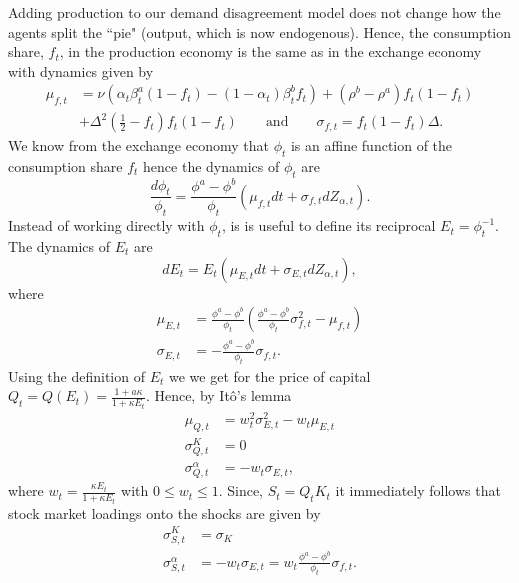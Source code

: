 Adding production to our demand disagreement model does not change how the agents split the ``pie" (output, which is now endogenous). Hence, the consumption share, $f_t$, in the production economy is the same as in the exchange economy with dynamics given by
\begin{equation}
  \begin{split}
	\label{eq:muf}
	\mu_{f,t} &= \nu\left(\alpha_t \beta^a_t \left(1-f_t\right) - \left(1-\alpha_t\right)\beta^b_t f_t\right) + \left(\rho^b-\rho^a\right)f_t\left(1-f_t\right) \\ 
	&+ \Delta^2 \left( \frac{1}{2} - f_t \right) f_t\left(1-f_t\right) 
	\qquad \text{and} \qquad \sigma_{f,t} = f_t (1-f_t) \Delta. 
  \end{split}
\end{equation}
We know from the exchange economy that $\phi_t$ is an affine function of the consumption share $f_t$ hence the dynamics of $\phi_t$ are
\begin{equation}
	\frac{d\phi_t}{\phi_t} = \frac{\phi^a-\phi^b}{\phi_t}\left(\mu_{f,t}dt + \sigma_{f,t}dZ_{\alpha,t}\right).
\end{equation}
Instead of working directly with $\phi_t$, is is useful to define its reciprocal $E_t = \phi_t^{-1}$. The dynamics of $E_t$ are 
\begin{equation}
	dE_t = E_t\left(\mu_{E,t}dt + \sigma_{E,t}dZ_{\alpha,t}\right),
\end{equation}
where 
\begin{align}
	\mu_{E,t} &=  \frac{\phi^a-\phi^b}{\phi_t}\left(\frac{\phi^a-\phi^b}{\phi_t}\sigma_{f,t}^2 - \mu_{f,t}\right) \\
	\sigma_{E,t} &=   -\frac{\phi^a-\phi^b}{\phi_t}\sigma_{f,t}.
\end{align}
Using the definition of $E_t$ we we get for the price of capital $Q_t = Q\left(E_t\right) = \frac{1+a \kappa}{1+\kappa E_t}$. Hence, by It\^o's lemma 
\begin{align}
	\mu_{Q,t} &= w_t^2 \sigma_{E,t}^2 - w_t \mu_{E,t} \\
	\sigma^{K}_{Q,t} &=  0 \\
	\sigma^{\alpha}_{Q,t} &=  -w_t \sigma_{E,t},   
\end{align}
where $w_t = \frac{\kappa E_t}{1+\kappa E_t}$ with $0 \leq w_t \leq 1$. Since, $S_t = Q_t K_t$ it immediately follows that stock market loadings onto the shocks are given by
\begin{align}
	\sigma^K_{S,t} &=  \sigma_K \\
	\sigma^{\alpha}_{S,t} &=  -w_t \sigma_{E,t} = w_t  \frac{\phi^a-\phi^b}{\phi_t}\sigma_{f,t}. \label{stockmarketloading}
\end{align}
